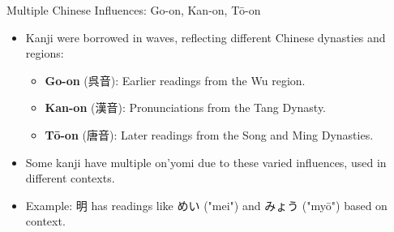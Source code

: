 \documentclass[xetex]{beamer}
\begin{document}
\begin{frame}{Multiple Chinese Influences: Go-on, Kan-on, Tō-on}
\begin{itemize}
    \item Kanji were borrowed in waves, reflecting different Chinese dynasties and regions:
    \begin{itemize}
        \item \textbf{Go-on} (\textjapanese{呉音}): Earlier readings from the Wu region.
        \item \textbf{Kan-on} (\textjapanese{漢音}): Pronunciations from the Tang Dynasty.
        \item \textbf{Tō-on} (\textjapanese{唐音}): Later readings from the Song and Ming Dynasties.
    \end{itemize}
    \item Some kanji have multiple on’yomi due to these varied influences, used in different contexts.
    \item Example: \textjapanese{明} has readings like \textjapanese{めい} ("mei") and \textjapanese{みょう} ("myō") based on context.
\end{itemize}
\end{frame}

\end{document}
